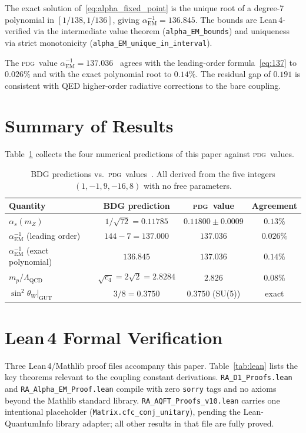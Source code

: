 \documentclass[11pt,twocolumn]{article}
\newcommand{\alphas}{\alpha_s}
\newcommand{\alphaEM}{\alpha_{\mathrm{EM}}}
\newcommand{\sinW}{\sin^2\!\theta_W}
\newcommand{\PDG}{\textsc{pdg}}
\begin{document}
The exact solution of~\eqref{eq:alpha_fixed_point} is the unique root of
a degree-7 polynomial in $[1/138, 1/136]$, giving
$\alphaEM^{-1} = 136.845$.
The bounds are Lean\,4-verified via the intermediate value theorem
(\texttt{alpha\_EM\_bounds}) and uniqueness via strict monotonicity
(\texttt{alpha\_EM\_unique\_in\_interval}).

The \PDG\ value $\alphaEM^{-1} = 137.036$~\cite{PDG2024}
agrees with the leading-order formula~\eqref{eq:137} to $0.026\%$
and with the exact polynomial root to $0.14\%$.
The residual gap of $0.191$ is consistent with
QED higher-order radiative corrections to the bare coupling.

\section{Summary of Results}

Table~\ref{tab:results} collects the four numerical predictions of
this paper against \PDG\ values.

\begin{table}[t]
\centering
\caption{BDG predictions vs.\ \PDG\ values~\cite{PDG2024}.
  All derived from the five integers $(1,-1,9,-16,8)$ with no free
  parameters.}
\label{tab:results}
\begin{tabular}{lccc}
\hline\hline
Quantity & BDG prediction & \PDG\ value & Agreement \\
\hline
$\alphas(m_Z)$ & $1/\sqrt{72} = 0.11785$ & $0.11800 \pm 0.0009$ & $0.13\%$ \\
$\alphaEM^{-1}$ (leading order) & $144 - 7 = 137.000$ & $137.036$ & $0.026\%$ \\
$\alphaEM^{-1}$ (exact polynomial) & $136.845$ & $137.036$ & $0.14\%$ \\
$m_p/\Lambda_\mathrm{QCD}$ & $\sqrt{c_4} = 2\sqrt{2} = 2.8284$ & $2.826$ & $0.08\%$ \\
$\sinW|_\mathrm{GUT}$ & $3/8 = 0.3750$ & $0.3750$ (SU(5)) & exact \\
\hline\hline
\end{tabular}
\end{table}

\section{Lean\,4 Formal Verification}

Three Lean\,4/Mathlib proof files accompany this paper.
Table~\ref{tab:lean} lists the key theorems relevant to the
coupling constant derivations.
\texttt{RA\_D1\_Proofs.lean} and \texttt{RA\_Alpha\_EM\_Proof.lean}
compile with zero \texttt{sorry} tags and no axioms beyond the
Mathlib standard library.
\texttt{RA\_AQFT\_Proofs\_v10.lean} carries one intentional
placeholder (\texttt{Matrix.cfc\_conj\_unitary}), pending the
Lean-QuantumInfo library adapter; all other results in that file
are fully proved.
\end{document}
